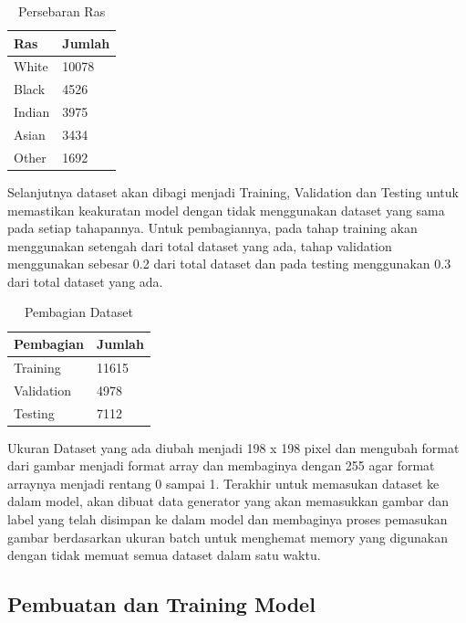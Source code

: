 \begin{table}
  \caption{Persebaran Ras}
  \label{tab:persebaranras}
  \centering
  \begin{tabular}{ll}
    \toprule
    \textbf{Ras} & \textbf{Jumlah} \\
    \midrule
    White           & 10078           \\
    Black           & 4526            \\
    Indian          & 3975            \\
    Asian           & 3434            \\
    Other           & 1692            \\
    \bottomrule
  \end{tabular}
\end{table}

Selanjutnya dataset akan dibagi menjadi Training, Validation dan Testing untuk memastikan keakuratan model dengan tidak menggunakan dataset 
yang sama pada setiap tahapannya. Untuk pembagiannya, pada tahap training akan menggunakan setengah 
dari total dataset yang ada, tahap validation menggunakan sebesar 0.2 dari total dataset dan pada 
testing menggunakan 0.3 dari total dataset yang ada.

\begin{table}
  \caption{Pembagian Dataset}
  \label{tab:pembagiandataset}
  \centering
  \begin{tabular}{ll}
    \toprule
    \textbf{Pembagian} & \textbf{Jumlah} \\
    \midrule
    Training           & 11615          \\
    Validation         & 4978            \\
    Testing            & 7112            \\
    \bottomrule
  \end{tabular}
\end{table}

Ukuran Dataset yang ada diubah menjadi 198 x 198 pixel dan mengubah format dari gambar menjadi format array dan membaginya dengan 255 agar
format arraynya menjadi rentang 0 sampai 1. Terakhir untuk memasukan dataset ke dalam model, akan dibuat data generator yang akan 
memasukkan gambar dan label yang telah disimpan ke dalam model dan membaginya proses pemasukan gambar berdasarkan ukuran batch 
untuk menghemat memory yang digunakan dengan tidak memuat semua dataset dalam satu waktu.


\subsection{Pembuatan dan Training Model}
\label{subsec:model}


